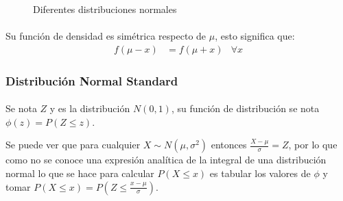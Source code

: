 \documentclass[../main.tex]{subfiles}
\begin{document}
\begin{figure}[H]
\center

  \caption{Diferentes distribuciones normales}
\end{figure}

\paragraph{} Su función de densidad es simétrica respecto de \(\mu\), esto significa que:
\begin{align*}
  f(\mu - x) &= f(\mu + x) & \forall x
\end{align*}

\subsubsection{Distribución Normal Standard}

\paragraph{} Se nota \(Z\) y es la distribución \(N(0, 1)\), su función de distribución se nota \(\phi(z) = P(Z \leq z)\).

Se puede ver que para cualquier \(X \sim N(\mu, \sigma^{2})\) entonces \(\frac{X - \mu}{\sigma} = Z\), por lo que como no se conoce una expresión analítica de la integral de una distribución normal lo que se hace para calcular \(P(X \leq x)\) es tabular los valores de \(\phi\) y tomar \(P(X \leq x) = P(Z \leq \frac{x - \mu}{\sigma})\).
\end{document}
